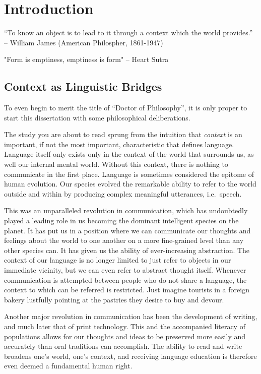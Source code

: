 \chapter{Introduction}
\label{chap:intro}

“To know an object is to lead to it through a context which the world provides.” -- William James (American Philospher, 1861-1947)

"Form is emptiness, emptiness is form" -- Heart Sutra

\section{Context as Linguistic Bridges}


To even begin to merit the title of ``Doctor of Philosophy'', it is only proper
to start this dissertation with some philosophical deliberations.

The study you are about to read sprung from the intuition that \emph{context}
is an important, if not the most important, characteristic that defines
language. Language itself only exists only in the context of the world that
surrounds us, as well our internal mental world. Without this context, there is
nothing to communicate in the first place. Language is sometimes considered the
epitome of human evolution. Our species evolved the remarkable ability to refer
to the world outside and within by producing complex meaningful utterances,
i.e.\ speech.


This was an unparalleled revolution in communication, which has
undoubtedly played a leading role in us becoming the dominant intelligent
species on the planet. It has put us in a position where we can communicate our
thoughts and feelings about the world to one another on a more fine-grained
level than any other species can. It has given us the ability of
ever-increasing abstraction. The context of our language is no longer
limited to just refer to objects in our immediate vicinity, but we can even
refer to abstract thought itself. Whenever communication is attempted between
people who do not share a language, the context to which can be referred is
restricted.  Just imagine tourists in a foreign bakery lustfully
pointing at the pastries they desire to buy and devour.

Another major revolution in communication has been the development of writing,
and much later that of print technology. This and the accompanied literacy of
populations allows for our thoughts and ideas to be preserved more easily and
accurately than oral traditions can accomplish. The ability to read and write
broadens one's world, one's context, and receiving language education is
therefore even deemed a fundamental human right.

